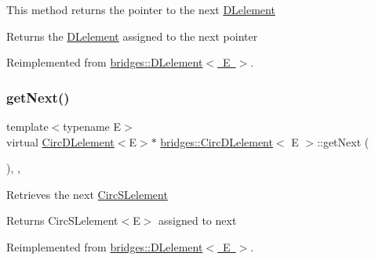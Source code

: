 This method returns the pointer to the next \mbox{\hyperlink{classbridges_1_1_d_lelement}{D\+Lelement}} \begin{DoxyReturn}{Returns}
the \mbox{\hyperlink{classbridges_1_1_d_lelement}{D\+Lelement}} assigned to the next pointer 
\end{DoxyReturn}


Reimplemented from \mbox{\hyperlink{classbridges_1_1_d_lelement_a648012849263b4b1cd2d504d5e5fd880}{bridges\+::\+D\+Lelement$<$ E $>$}}.

\mbox{\label{classbridges_1_1_circ_d_lelement_a52996d42efc5680d1f8b406143abfee5}} 
\subsubsection{\texorpdfstring{get\+Next()}{getNext()}\hspace{0.1cm}{\footnotesize\ttfamily [2/2]}}
{\footnotesize\ttfamily template$<$typename E$>$ \\
virtual \mbox{\hyperlink{classbridges_1_1_circ_d_lelement}{Circ\+D\+Lelement}}$<$E$>$$\ast$ \mbox{\hyperlink{classbridges_1_1_circ_d_lelement}{bridges\+::\+Circ\+D\+Lelement}}$<$ E $>$\+::get\+Next (\begin{DoxyParamCaption}{ }\end{DoxyParamCaption})\hspace{0.3cm}{\ttfamily [inline]}, {\ttfamily [override]}, {\ttfamily [virtual]}}

Retrieves the next \mbox{\hyperlink{classbridges_1_1_circ_s_lelement}{Circ\+S\+Lelement}} \begin{DoxyReturn}{Returns}
Circ\+S\+Lelement$<$\+E$>$ assigned to next 
\end{DoxyReturn}


Reimplemented from \mbox{\hyperlink{classbridges_1_1_d_lelement_a0c713707d8c7d0a97fe4194ed6592ede}{bridges\+::\+D\+Lelement$<$ E $>$}}.

\mbox{\label{classbridges_1_1_circ_d_lelement_a8a1aa2f979094bccf2cca2ca31f0373d}} 

